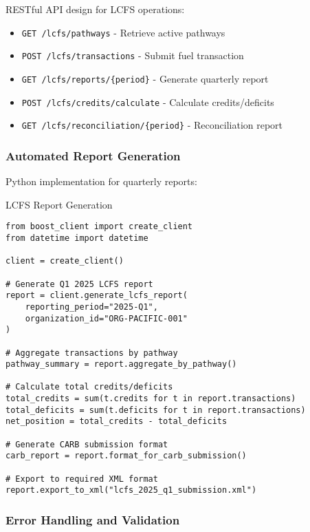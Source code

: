 RESTful API design for LCFS operations:

\begin{itemize}
    \item \texttt{GET /lcfs/pathways} - Retrieve active pathways
    \item \texttt{POST /lcfs/transactions} - Submit fuel transaction
    \item \texttt{GET /lcfs/reports/\{period\}} - Generate quarterly report
    \item \texttt{POST /lcfs/credits/calculate} - Calculate credits/deficits
    \item \texttt{GET /lcfs/reconciliation/\{period\}} - Reconciliation report
\end{itemize}

\subsubsection{Automated Report Generation}

Python implementation for quarterly reports:

\begin{pythonexample}{LCFS Report Generation}
\begin{verbatim}
from boost_client import create_client
from datetime import datetime

client = create_client()

# Generate Q1 2025 LCFS report
report = client.generate_lcfs_report(
    reporting_period="2025-Q1",
    organization_id="ORG-PACIFIC-001"
)

# Aggregate transactions by pathway
pathway_summary = report.aggregate_by_pathway()

# Calculate total credits/deficits
total_credits = sum(t.credits for t in report.transactions)
total_deficits = sum(t.deficits for t in report.transactions)
net_position = total_credits - total_deficits

# Generate CARB submission format
carb_report = report.format_for_carb_submission()

# Export to required XML format
report.export_to_xml("lcfs_2025_q1_submission.xml")
\end{verbatim}
\end{pythonexample}

\subsubsection{Error Handling and Validation}

